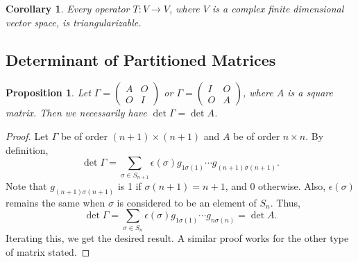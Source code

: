 \documentclass[15pt,a4paper]{book}
\newtheorem{proposition}[theorem]{Proposition}
\newtheorem{corollary}[theorem]{Corollary}
\theoremstyle{definition}
\begin{document}
\begin{corollary}
    Every operator $T:V \to V$, where $V$ is a complex finite dimensional vector space, is triangularizable.
\end{corollary}

\subsection{Determinant of Partitioned Matrices}

\begin{proposition}
    Let $\Gamma = \begin{pmatrix}
        A & O \\ O & I
    \end{pmatrix}$ or $\Gamma = \begin{pmatrix}
        I & O \\ O & A
    \end{pmatrix}$, where $A$ is a square matrix. Then we necessarily have $\det{\Gamma} = \det{A}$.
\end{proposition}
\begin{proof}
    Let $\Gamma$ be of order $(n+1) \times (n+1)$ and $A$ be of order $n \times n$. By definition,
    \begin{equation}
        \det{\Gamma} = \sum_{\sigma \in S_{n+1}} \epsilon(\sigma) g_{1 \sigma(1)} \cdots g_{(n+1) \sigma(n+1)}.
    \end{equation}
    Note that $g_{(n+1)\sigma(n+1)}$ is 1 if $\sigma(n+1) = n+1$, and $0$ otherwise. Also, $\epsilon(\sigma)$ remains the same when $\sigma$ is considered to be an element of $S_{n}$. Thus,
    \begin{equation}
        \det \Gamma = \sum_{\sigma \in S_{n}} \epsilon(\sigma) g_{1 \sigma(1)} \cdots g_{n \sigma(n)} = \det A.
    \end{equation}
    Iterating this, we get the desired result. A similar proof works for the other type of matrix stated.
\end{proof}
\end{document}
